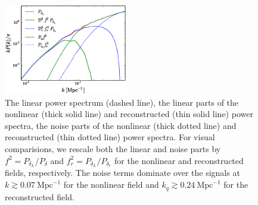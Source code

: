 \documentclass[aps,prd,twocolumn,showpacs,superscriptaddress,groupedaddress,nofootinbib]{revtex4}  %
\newcommand{\mr}{\mathrm}
\begin{document}
\begin{figure}[tbp]
\begin{center}
\includegraphics[width=0.48\textwidth]{f2.eps}
\end{center}
\vspace{-0.7cm}
\caption{The linear power spectrum (dashed line), the linear parts of the
nonlinear (thick solid line) and reconstructed (thin solid line) power spectra,
the noise parts of the nonlinear (thick dotted line) and reconstructed
(thin dotted line) power spectra. 
For visual comparisions, we rescale both the linear and noise parts by 
$f^2=P_{\delta_L}/P_{\delta}$ and $f^2_r=P_{\delta_L}/P_{\delta_r}$ for the nonlinear and reconstructed fields, respectively. 
The noise terms dominate over the signals at 
$k\gtrsim0.07\ \mr{Mpc}^{-1}$ for the nonlinear field and $k_q\gtrsim0.24\ \mr{Mpc}^{-1}$
for the reconstructed field.}
\label{fig:pn}
\end{figure}
\end{document}
